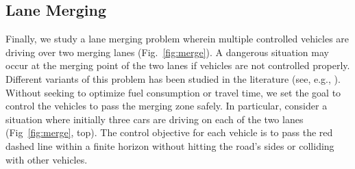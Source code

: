 %
%




\subsection{Lane Merging}
Finally, we study a lane merging problem wherein multiple controlled vehicles are driving over two merging lanes (Fig.~\ref{fig:merge}). A dangerous situation may occur at the merging point of the two lanes if vehicles are not controlled properly. Different variants of this problem has been studied in the literature (see, e.g., \cite{xiao2019merging,xiao2020merging}). Without seeking to optimize fuel consumption or travel time, we set the goal to control the vehicles to pass the merging zone safely. In particular, consider a situation where initially three cars are driving on each of the two lanes (Fig~\ref{fig:merge}, top). The control objective for each vehicle is to pass the red dashed line within a finite horizon without hitting the road's sides or colliding with other vehicles. 

